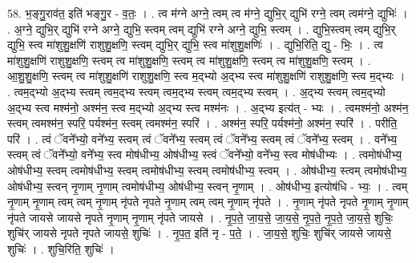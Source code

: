 \documentclass[17pt]{extarticle}
\begin{document}
58. भ॒ङ्गु॒राव॑त॒ इति॑ भङ्गु॒र - व॒तः॒ । . त्व म॑ग्ने अग्ने॒ त्वम् त्व म॑ग्ने॒ द्युभि॒र् द्युभि॑ रग्ने॒ त्वम् त्वम॑ग्ने॒ द्युभिः॑ । . अ॒ग्ने॒ द्युभि॒र् द्युभि॑ रग्ने अग्ने॒ द्युभि॒ स्त्वम् त्वम् द्युभि॑ रग्ने अग्ने॒ द्युभि॒ स्त्वम् । . द्युभि॒स्त्वम् त्वम् द्युभि॒र् द्युभि॒ स्त्व मा॑शुशु॒क्षणि॑ राशुशु॒क्षणि॒ स्त्वम् द्युभि॒र् द्युभि॒ स्त्व मा॑शुशु॒क्षणिः॑ । . द्युभि॒रिति॒ द्यु - भिः॒ । . त्व मा॑शुशु॒क्षणि॑ राशुशु॒क्षणि॒ स्त्वम् त्व मा॑शुशु॒क्षणि॒ स्त्वम् त्व मा॑शुशु॒क्षणि॒ स्त्वम् त्व मा॑शुशु॒क्षणि॒ स्त्वम् । . आ॒शु॒शु॒क्षणि॒ स्त्वम् त्व मा॑शुशु॒क्षणि॑ राशुशु॒क्षणि॒ स्त्व म॒द्भ्यो अ॒द्भ्य स्त्व मा॑शुशु॒क्षणि॑ राशुशु॒क्षणि॒ स्त्व म॒द्भ्यः । . त्वम॒द्भ्यो अ॒द्भ्य स्त्वम् त्वम॒द्भ्य स्त्वम् त्वम॒द्भ्य स्त्वम् त्वम॒द्भ्य स्त्वम् । . अ॒द्भ्य स्त्वम् त्वम॒द्भ्यो अ॒द्भ्य स्त्व मश्म॑नो॒ अश्म॑न॒ स्त्व म॒द्भ्यो अ॒द्भ्य स्त्व मश्म॑नः । . अ॒द्भ्य इत्य॑त् - भ्यः । . त्वमश्म॑नो॒ अश्म॑न॒ स्त्वम् त्वमश्म॑न॒ स्परि॒ पर्यश्म॑न॒ स्त्वम् त्वमश्म॑न॒ स्परि॑ । . अश्म॑न॒ स्परि॒ पर्यश्म॑नो॒ अश्म॑न॒ स्परि॑ । . परीति॒ परि॑ । . त्वं ॅवने᳚भ्यो॒ वने᳚भ्य॒ स्त्वम् त्वं ॅवने᳚भ्य॒ स्त्वम् त्वं ॅवने᳚भ्य॒ स्त्वम् त्वं ॅवने᳚भ्य॒ स्त्वम् । . वने᳚भ्य॒ स्त्वम् त्वं ॅवने᳚भ्यो॒ वने᳚भ्य॒ स्त्व मोष॑धीभ्य॒ ओष॑धीभ्य॒ स्त्वं ॅवने᳚भ्यो॒ वने᳚भ्य॒ स्त्व मोष॑धीभ्यः । . त्वमोष॑धीभ्य॒ ओष॑धीभ्य॒ स्त्वम् त्वमोष॑धीभ्य॒ स्त्वम् त्वमोष॑धीभ्य॒ स्त्वम् त्वमोष॑धीभ्य॒ स्त्वम् । . ओष॑धीभ्य॒ स्त्वम् त्वमोष॑धीभ्य॒ ओष॑धीभ्य॒ स्त्वन् नृ॒णाम् नृ॒णाम् त्वमोष॑धीभ्य॒ ओष॑धीभ्य॒ स्त्वन् नृ॒णाम् । . ओष॑धीभ्य॒ इत्योष॑धि - भ्यः॒ । . त्वम् नृ॒णाम् नृ॒णाम् त्वम् त्वम् नृ॒णाम् नृ॑पते नृपते नृ॒णाम् त्वम् त्वम् नृ॒णाम् नृ॑पते । . नृ॒णाम् नृ॑पते नृपते नृ॒णाम् नृ॒णाम् नृ॑पते जायसे जायसे नृपते नृ॒णाम् नृ॒णाम् नृ॑पते जायसे । . नृ॒प॒ते॒ जा॒य॒से॒ जा॒य॒से॒ नृ॒प॒ते॒ नृ॒प॒ते॒ जा॒य॒से॒ शुचिः॒ शुचि॑र् जायसे नृपते नृपते जायसे॒ शुचिः॑ । . नृ॒प॒त॒ इति॑ नृ - प॒ते॒ । . जा॒य॒से॒ शुचिः॒ शुचि॑र् जायसे जायसे॒ शुचिः॑ । . शुचि॒रिति॒ शुचिः॑ । \newline
\pagebreak
{}
\end{document}
